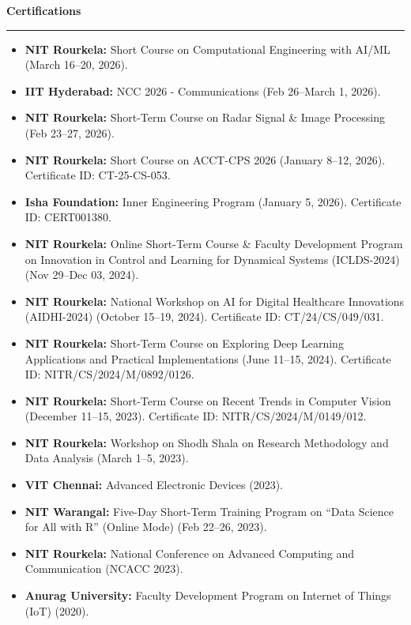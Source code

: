 \documentclass[a4paper,11pt]{article}
\renewcommand{\section}[1]{%
  \vspace{8pt}%
  {\large\scshape\raggedright #1}%
  \vspace{3pt}\hrule\vspace{4pt}%
}
\begin{document}
\section{\textbf{Certifications}}
\begin{itemize}[leftmargin=*, label={},topsep=0pt,partopsep=0pt,itemsep=1pt,parsep=0pt]
    \item \textbf{NIT Rourkela:} Short Course on Computational Engineering with AI/ML (March 16--20, 2026).
    \item \textbf{IIT Hyderabad:} NCC 2026 - Communications (Feb 26--March 1, 2026).
    \item \textbf{NIT Rourkela:} Short-Term Course on Radar Signal \& Image Processing (Feb 23--27, 2026).
    \item \textbf{NIT Rourkela:} Short Course on ACCT-CPS 2026 (January 8--12, 2026). Certificate ID: CT-25-CS-053.
    \item \textbf{Isha Foundation:} Inner Engineering Program (January 5, 2026). Certificate ID: CERT001380.
    \item \textbf{NIT Rourkela:} Online Short-Term Course \& Faculty Development Program on Innovation in Control and Learning for Dynamical Systems (ICLDS-2024) (Nov 29--Dec 03, 2024).
    \item \textbf{NIT Rourkela:} National Workshop on AI for Digital Healthcare Innovations (AIDHI-2024) (October 15--19, 2024). Certificate ID: CT/24/CS/049/031.
    \item \textbf{NIT Rourkela:} Short-Term Course on Exploring Deep Learning Applications and Practical Implementations (June 11--15, 2024). Certificate ID: NITR/CS/2024/M/0892/0126.
    \item \textbf{NIT Rourkela:} Short-Term Course on Recent Trends in Computer Vision (December 11--15, 2023). Certificate ID: NITR/CS/2024/M/0149/012.
    \item \textbf{NIT Rourkela:} Workshop on Shodh Shala on Research Methodology and Data Analysis (March 1--5, 2023).
    \item \textbf{VIT Chennai:} Advanced Electronic Devices (2023).
    \item \textbf{NIT Warangal:} Five-Day Short-Term Training Program on ``Data Science for All with R'' (Online Mode) (Feb 22--26, 2023).
    \item \textbf{NIT Rourkela:} National Conference on Advanced Computing and Communication (NCACC 2023).
    \item \textbf{Anurag University:} Faculty Development Program on Internet of Things (IoT) (2020).

\end{itemize}
\end{document}
